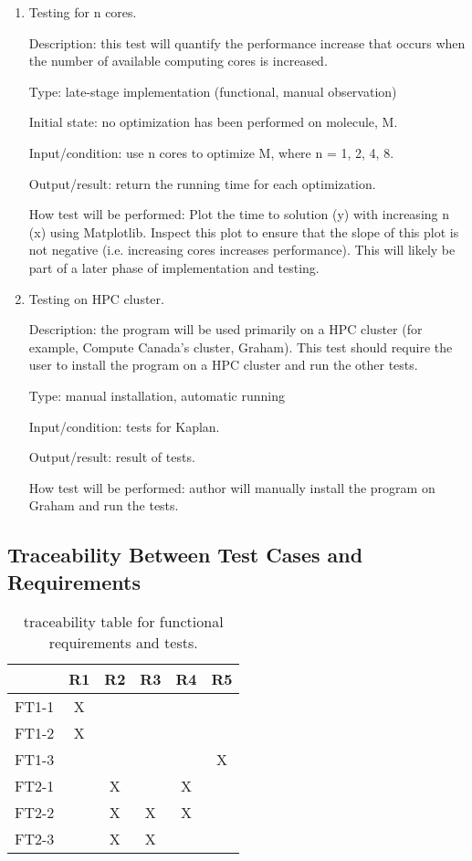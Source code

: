 \documentclass[12pt, titlepage]{article}
\newcommand{\progname}{Kaplan} %
\begin{document}
\begin{enumerate}
	\item Testing for n cores.
	
	Description: this test will quantify the performance increase that occurs 
	when the number of available computing cores is increased.
	
	Type: late-stage implementation (functional, manual observation)
	
	Initial state: no optimization has been performed on molecule, M.
	
	Input/condition: use n cores to optimize M, where n = 1, 2, 4, 8.
	
	Output/result: return the running time for each optimization. 
	
	How test will be performed: Plot the time to solution (y) with increasing n 
	(x) using Matplotlib. Inspect this plot to ensure that the slope of this 
	plot is not negative (i.e. increasing cores increases performance). This 
	will likely be part of a later phase of implementation and
        testing.
	
	\item Testing on HPC cluster.
	
	Description: the program will be used primarily on a HPC cluster (for 
	example, Compute Canada's cluster, Graham). This test should require the 
	user to install the program on a HPC cluster and run the other tests.
	
	Type: manual installation, automatic running
	
	Input/condition: tests for \progname{}.
	
	Output/result: result of tests.
	
	How test will be performed: author will manually install the program on 
	Graham and run the tests. 
	
	
\end{enumerate}

\subsection{Traceability Between Test Cases and 
Requirements}\label{section-tables}

\begin{table}[H]
	\begin{center}
	\begin{tabular}{|l|c|c|c|c|c|}
		\hline
		& R1 & R2 & R3 & R4 & R5 \\
		\hline
		FT1-1 & X  &    &    &    &    \\
		\hline
		FT1-2 & X  &    &    &    &    \\
		\hline
		FT1-3 &    &    &    &    & X  \\
		\hline
		FT2-1 &    & X  &    & X  &    \\
		\hline
		FT2-2 &    & X  & X  & X  &    \\
		\hline
		FT2-3 &    & X  & X  &    &   \\
		\hline
	\end{tabular}
\end{center}
\caption{traceability table for functional requirements and tests.}
\end{table}
\end{document}
